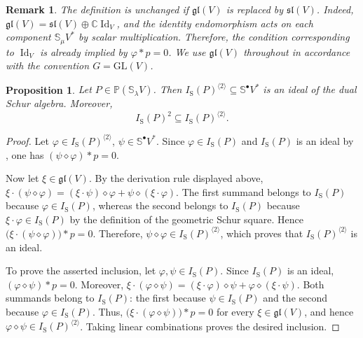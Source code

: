 \documentclass[a4paper,reqno]{amsart}
\theoremstyle{plainnopunct}
\newtheorem{proposition}[proposition]{Proposition}
\theoremstyle{definitionnopunct}
\newtheorem{remark}[remark]{Remark}
\newcommand{\C}{\mathbb{C}}
\renewcommand{\P}{\mathbb{P}}
\renewcommand{\S}{\mathbb{S}}
\newcommand{\GL}{\mathrm{GL}}
\newcommand{\Lie}{\mathfrak}
\begin{document}
\begin{remark}
\label{rem: gl versus sl geometric Schur square}
The definition is unchanged if $\Lie{gl}(V)$ is replaced by $\Lie{sl}(V)$. Indeed, $\Lie{gl}(V) = \Lie{sl}(V)\oplus\C\operatorname{Id}_V$, and the identity endomorphism acts on each component $\S_\mu V^*$ by scalar multiplication. Therefore, the condition corresponding to $\operatorname{Id}_V$ is already implied by $\varphi*p=0$. We use $\Lie{gl}(V)$ throughout in accordance with the convention $G=\GL(V)$.
\end{remark}

\begin{proposition}
\label{prop: geometric Schur square ideal}
Let $P\in\P(\S_\lambda V)$. Then $I_{\mathrm S}(P)^{\langle2\rangle}
\subseteq
\S^\bullet V^*$ is an ideal of the dual Schur algebra. Moreover,
\[I_{\mathrm S}(P)^2
\subseteq
I_{\mathrm S}(P)^{\langle2\rangle}.
\]\end{proposition}

\begin{proof}
Let $\varphi\in I_{\mathrm S}(P)^{\langle2\rangle}$, $\psi\in\S^\bullet V^*$. Since $\varphi\in I_{\mathrm S}(P)$ and $I_{\mathrm S}(P)$ is an ideal by , one has $(\psi\diamond\varphi)*p=0$.

Now let $\xi\in\Lie{gl}(V)$. By the derivation rule displayed above,  $\xi\cdot(\psi\diamond\varphi)
=
(\xi\cdot\psi)\diamond\varphi
+
\psi\diamond(\xi\cdot\varphi)$.
The first summand belongs to $I_{\mathrm S}(P)$ because $\varphi\in I_{\mathrm S}(P)$, whereas the second belongs to $I_{\mathrm S}(P)$ because $\xi\cdot\varphi\in I_{\mathrm S}(P)$ by the definition of the geometric Schur square. Hence $\bigl( \xi\cdot(\psi\diamond\varphi) \bigr)*p = 0$. Therefore, $\psi\diamond\varphi
\in
I_{\mathrm S}(P)^{\langle2\rangle}$, which proves that $I_{\mathrm S}(P)^{\langle2\rangle}$ is an ideal.

To prove the asserted inclusion, let $
\varphi,\psi\in I_{\mathrm S}(P)$. Since $I_{\mathrm S}(P)$ is an ideal, $(\varphi\diamond\psi)*p=0$. Moreover, $\xi\cdot(\varphi\diamond\psi) = (\xi\cdot\varphi)\diamond\psi + \varphi\diamond(\xi\cdot\psi)$.
Both summands belong to $I_{\mathrm S}(P)$: the first because $\psi\in I_{\mathrm S}(P)$ and the second because $\varphi\in I_{\mathrm S}(P)$. Thus, $\bigl( \xi\cdot(\varphi\diamond\psi) \bigr)*p = 0$ for every $\xi\in\Lie{gl}(V)$, and hence $\varphi\diamond\psi \in I_{\mathrm S}(P)^{\langle2\rangle}$. Taking linear combinations proves the desired inclusion.
\end{proof}
\end{document}
